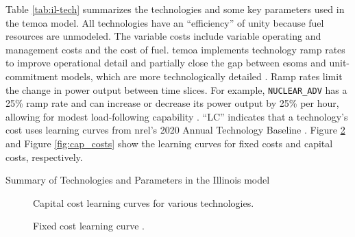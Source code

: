 Table \ref{tab:il-tech} summarizes the technologies and some key parameters
used in the \gls{temoa} model. All technologies have an ``efficiency'' of unity
because fuel resources are unmodeled. The variable costs
include variable operating and management costs and the cost of fuel. \gls{temoa}
implements technology ramp rates to improve operational detail and partially
close the gap between \glspl{esom} and unit-commitment models, which are more
technologically detailed \cite{de_queiroz_repurposing_2019}.
Ramp rates limit the change in power output between time slices. For example,
\texttt{NUCLEAR\_ADV} has a 25\% ramp rate and can increase or decrease
its power output by 25\% per hour, allowing for modest load-following capability
\cite{baseload_2017,lokhov_technical_2011}. ``LC'' indicates that a technology's cost
uses learning curves from \gls{nrel}'s 2020 Annual Technology Baseline \cite{nrel_2020_2020}.
Figure \ref{fig:fix_costs} and Figure \ref{fig:cap_costs} show the learning curves
for fixed costs and capital costs, respectively.

\begin{sidewaystable}
  \centering
  \caption{Summary of Technologies and Parameters in the Illinois model}
  \label{tab:il-tech}
  \resizebox{\textwidth}{!}{
  
  } %
\end{sidewaystable}


\begin{figure}[H]
  \centering
  \resizebox{0.6\textwidth}{!}{}
  \caption{Capital cost learning curves for various technologies.}
  \label{fig:capital-cost}
\end{figure}

\begin{figure}[H]
    \centering
    \resizebox{0.61\columnwidth}{!}{}
    \caption{Fixed cost learning curve \cite{nrel_2020_2020}.}
    \label{fig:fix_costs}
\end{figure}


